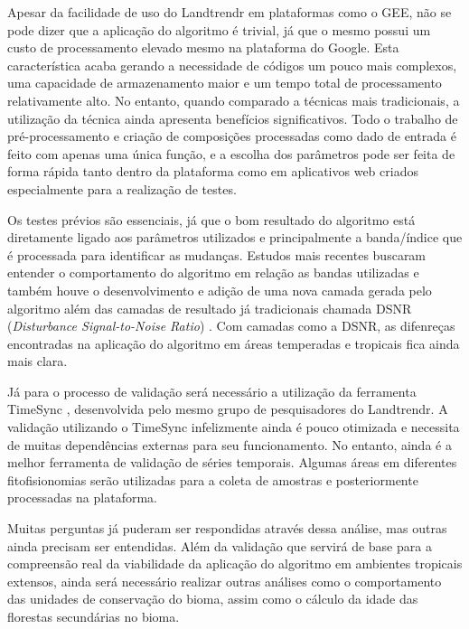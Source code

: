 Apesar da facilidade de uso do Landtrendr em plataformas como o GEE, não se pode dizer que a aplicação do algoritmo é trivial, já que o mesmo possui um custo de processamento elevado mesmo na plataforma do Google. Esta característica acaba gerando a necessidade de códigos um pouco mais complexos, uma capacidade de armazenamento maior e um tempo total de processamento relativamente alto. No entanto, quando comparado a técnicas mais tradicionais, a utilização da técnica ainda apresenta benefícios significativos. Todo o trabalho de pré-processamento e criação de composições processadas como dado de entrada é feito com apenas uma única função, e a escolha dos parâmetros pode ser feita de forma rápida tanto dentro da plataforma como em aplicativos web criados especialmente para a realização de testes. 

Os testes prévios são essenciais, já que o bom resultado do algoritmo está diretamente ligado aos parâmetros utilizados e principalmente a banda/índice que é processada para identificar as mudanças. Estudos mais recentes buscaram entender o comportamento do algoritmo em relação as bandas utilizadas e também houve o desenvolvimento e adição de uma nova camada gerada pelo algoritmo além das camadas de resultado já tradicionais chamada DSNR (\textit{Disturbance Signal-to-Noise Ratio}) \citep{COHEN2018131}. Com camadas como a DSNR, as difenreças encontradas na aplicação do algoritmo em áreas temperadas e tropicais fica ainda mais clara. 

Já para o processo de validação será necessário a utilização da ferramenta TimeSync \citep{COHEN20102911}, desenvolvida pelo mesmo grupo de pesquisadores do Landtrendr. A validação utilizando o TimeSync infelizmente ainda é pouco otimizada e necessita de muitas dependências externas para seu funcionamento. No entanto, ainda é a melhor ferramenta de validação de séries temporais. Algumas áreas em diferentes fitofisionomias serão utilizadas para a coleta de amostras e posteriormente processadas na plataforma.

Muitas perguntas já puderam ser respondidas através dessa análise, mas outras ainda precisam ser entendidas. Além da validação que servirá de base para a compreensão real da viabilidade da aplicação do algoritmo em ambientes tropicais extensos, ainda será necessário realizar outras análises como o comportamento das unidades de conservação do bioma, assim como o cálculo da idade das florestas secundárias no bioma. \citep{Brooks2014} 
